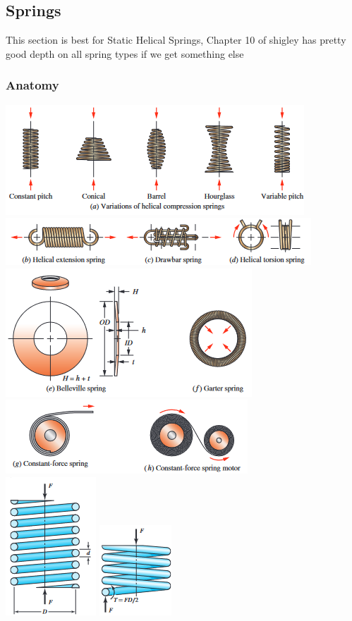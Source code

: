 \documentclass[11pt, fleqn]{article}
\begin{document}
\subsection{Springs}
This section is best for Static Helical Springs, Chapter 10 of shigley has pretty good depth on all spring types if we get something else
\subsubsection{Anatomy}
\includegraphics[scale = 0.6]{Springs/Variations.png}
\includegraphics[scale = 0.6]{Springs/Spring_Types.png}\\
\includegraphics[scale = 0.7]{Springs/Spring_Types2.png}
\includegraphics[scale = 0.7]{Springs/Spring_Types3.png}\\
\includegraphics[scale = 0.7]{Springs/Fig10-1a.png}
\includegraphics[scale = 0.7]{Springs/Fig10-1b.png}\\
\end{document}
